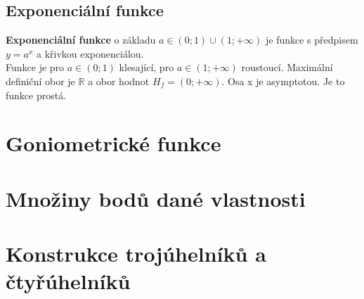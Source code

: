 \documentclass[12pt, a4paper]{article}
\begin{document}
\subsection*{Exponenciální funkce}
\textbf{Exponenciální funkce} o základu $a\in (0;1) \cup (1;+\infty)$ je funkce s předpisem $y=a^x$ a křivkou exponenciálou.\\
Funkce je pro $a \in (0;1)$ klesající, pro $a \in (1;+\infty)$ roustoucí. Maximální definiční obor je $\mathbb{R}$ a obor hodnot $H_f = (0;+\infty)$. Osa x je asymptotou. Je to funkce prostá.

\begin{figure}[H]
\centering
    \begin{minipage}{0.32\textwidth}
        \centering
    \end{minipage}%
\end{figure}

\section{Goniometrické funkce}
\section{Množiny bodů dané vlastnosti}
\section{Konstrukce trojúhelníků a čtyřúhelníků}
\end{document}
